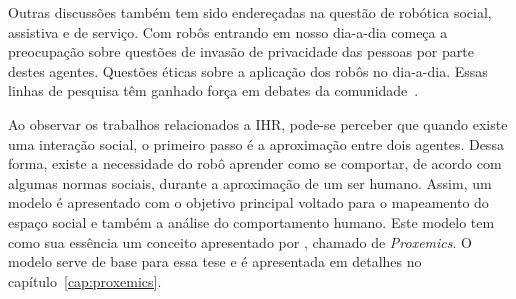 Outras discussões também tem sido endereçadas na questão de robótica social, assistiva e de serviço. Com robôs entrando em nosso dia-a-dia começa a preocupação sobre questões de invasão de privacidade das pessoas por parte destes agentes. Questões éticas sobre a aplicação dos robôs no dia-a-dia. Essas linhas de pesquisa têm ganhado força em debates da comunidade~\cite{rueben:2017}.

Ao observar os trabalhos relacionados a IHR, pode-se perceber que quando existe uma interação social, o primeiro passo é a aproximação entre dois agentes. Dessa forma, existe a necessidade do robô aprender como se comportar, de acordo com algumas normas sociais, durante a aproximação de um ser humano. Assim, um modelo é apresentado com o objetivo principal voltado para o mapeamento do espaço social e também a análise do comportamento humano. Este modelo tem como sua essência um conceito apresentado por , chamado de \emph{Proxemics}. O modelo serve de base para essa tese e é apresentada em detalhes no capítulo~\ref{cap:proxemics}.
